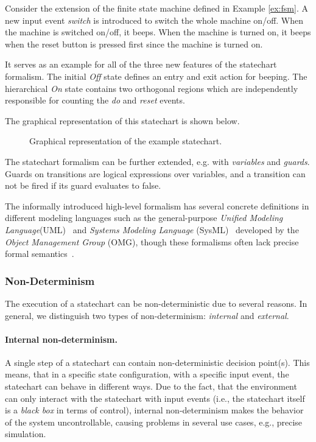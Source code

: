\begin{example}[Statechart]\label{ex:sch}
    Consider the extension of the finite state machine defined in Example \ref{ex:fsm}. A new input event \emph{switch} is introduced to switch the whole machine on/off. When the machine is switched on/off, it beeps. When the machine is turned on, it beeps when the reset button is pressed first since the machine is turned on.

    It serves as an example for all of the three new features of the statechart formalism. The initial \emph{Off} state defines an entry and exit action for beeping. The hierarchical \emph{On} state contains two orthogonal regions which are independently responsible for counting the \emph{do} and \emph{reset} events.

    The graphical representation of this statechart is shown below.

    \begin{figure}[htbp]
    \centering
    
    \caption{Graphical representation of the example statechart.}
    \label{fig:sch}
    \end{figure}
    
\end{example}

The statechart formalism can be further extended, e.g. with \textit{variables} and \textit{guards}. Guards on transitions are logical expressions over variables, and a transition can not be fired if its guard evaluates to false.

The informally introduced high-level formalism has several concrete definitions in different modeling languages such as the general-purpose \textit{Unified Modeling Language}(UML)~\cite{uml} and \textit{Systems Modeling Language} (SysML)~\cite{sysml} developed by the \textit{Object Management Group} (OMG), though these formalisms often lack precise formal semantics~\cite{Elekes2022}.

\subsubsection{Non-Determinism}

The execution of a statechart can be non-deterministic due to several reasons. In general, we distinguish two types of non-determinism: \textit{internal} and \textit{external}.

\paragraph{Internal non-determinism.} A single step of a statechart can contain non-deterministic decision point(s). This means, that in a specific state configuration, with a specific input event, the statechart can behave in different ways. Due to the fact, that the environment can only interact with the statechart with input events (i.e., the statechart itself is a \textit{black box} in terms of control), internal non-determinism makes the behavior of the system uncontrollable, causing problems in several use cases, e.g., precise simulation.

